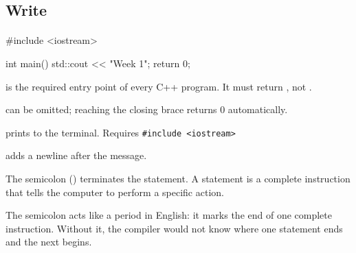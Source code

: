\documentclass[
    10pt,
    dvipsnames,
    svgnames,
    x11names,
    aspectratio=1610,
    english,
    codeminted]{beamer}
\begin{document}
\subsection*{Write}
\begingroup
\divframetrue
\renewcommand{\divbartextA}{\secname}
\renewcommand{\divbartextB}{}
\begin{frame}{\secname}
  \divbar{\secname}{\subsecname}
  \framesubtitle{\subsecname}


\begin{cppcodebasic}[][fontsize=\small]
#include <iostream>

int main() {
    std::cout << "Week 1\n";
    return 0;
}

\end{cppcodebasic}

\begin{compactitem}
\small
   \item {} is the required entry point of every C++ program. It must return , not .
   \begin{compactitem}
       \item {} can be omitted; reaching the closing brace returns 0 automatically.
   \end{compactitem}
   \item {}
   \begin{compactitem}
       \item {} prints to the terminal. Requires \texttt{#include <iostream>}
       \item {} adds a newline after the message.
       \item The semicolon (\mintcpp{;}) terminates the statement. A statement is a complete instruction that tells the computer to perform a specific action.
   \end{compactitem}
\end{compactitem}

\medskip
\begin{MyBox}
The semicolon acts like a period in English: it marks the end of one complete instruction. Without it, the compiler would not know where one statement ends and the next begins.
\end{MyBox}
\end{frame}
\endgroup
\end{document}
